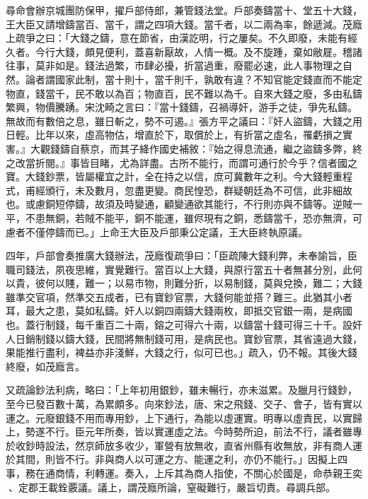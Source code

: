 \begin{pinyinscope}
尋命會辦京城團防保甲，擢戶部侍郎，兼管錢法堂。戶部奏鑄當十、堂五十大錢，王大臣又請增鑄當百、當千，謂之四項大錢。當千者，以二兩為率，餘遞減。茂廕上疏爭之曰：「大錢之鑄，意在節省，由漢訖明，行之屢矣。不久即廢，未能有經久者。今行大錢，頗見便利，蓋喜新厭故，人情一概。及不旋踵，棄如敝屣。稽諸往事，莫非如是。錢法過繁，市肆必擾，折當過重，廢罷必速，此人事物理之自然。論者謂國家此制，當十則十，當千則千，孰敢有違？不知官能定錢直而不能定物直，錢當千，民不敢以為百；物直百，民不難以為千。自來大錢之廢，多由私鑄繁興，物價騰踴。宋沈畸之言曰：『當十錢鑄，召禍導奸，游手之徒，爭先私鑄。無故而有數倍之息，雖日斬之，勢不可遏。』張方平之議曰：『奸人盜鑄，大錢之用日輕。比年以來，虛高物估，增直於下，取償於上，有折當之虛名，罹虧損之實害。』大觀錢鑄自蔡京，而其子絳作國史補敘：『始之得息流通，繼之盜鑄多弊，終之改當折閱。』事皆目睹，尤為詳盡。古所不能行，而謂可通行於今乎？信者國之寶。大錢鈔票，皆屬權宜之計，全在持之以信，庶可冀數年之利。今大錢輕重程式，甫經頒行，未及數月，忽盡更變。商民惶恐，群疑朝廷為不可信，此非細故也。或慮銅短停鑄，故須及時變通，顧變通欲其能行，不行則亦與不鑄等。逆賊一平，不患無銅，若賊不能平，銅不能運，雖侭現有之銅，悉鑄當千，恐亦無濟，可慮者不僅停鑄而已。」上命王大臣及戶部秉公定議，王大臣終執原議。

四年，戶部會奏推廣大錢辦法，茂廕復疏爭曰：「臣疏陳大錢利弊，未奉諭旨，臣職司錢法，夙夜思維，實覺難行。當百以上大錢，與原行當五十者無甚分別，此何以貴，彼何以賤，難一；以易市物，則難分折，以易制錢，莫與兌換，難二；大錢雖準交官項，然準交五成者，已有寶鈔官票，大錢何能並搭？難三。此猶其小者耳，最大之患，莫如私鑄。奸人以銅四兩鑄大錢兩枚，即抵交官銀一兩，是病國也。蓋行制錢，每千重百二十兩，鎔之可得六十兩，以鑄當十錢可得三十千。設奸人日銷制錢以鑄大錢，民間將無制錢可用，是病民也。寶鈔官票，其省遠過大錢，果能推行盡利，裨益亦非淺鮮，大錢之行，似可已也。」疏入，仍不報。其後大錢終廢，如茂廕言。

又疏論鈔法利病，略曰：「上年初用銀鈔，雖未暢行，亦未滋累。及臘月行錢鈔，至今已發百數十萬，為累頗多。向來鈔法，唐、宋之飛錢、交子、會子，皆有實以運之。元廢銀錢不用而專用鈔，上下通行，為能以虛運實。明專以虛責民，以實歸上，勢遂不行。臣元年所奏，皆以實運虛之法。今時勢所迫，前法不行，議者雖專於收鈔時設法，然京師放多收少，軍營有放無收，直省州縣有收無放，非有商人運於其間，則皆不行。非與商人以可運之方、能運之利，亦仍不能行。」因擬上四事，務在通商情，利轉運。奏入，上斥其為商人指使，不關心於國是，命恭親王奕、定郡王載銓覈議。議上，謂茂廕所論，窒礙難行，嚴旨切責。尋調兵部。


\end{pinyinscope}
